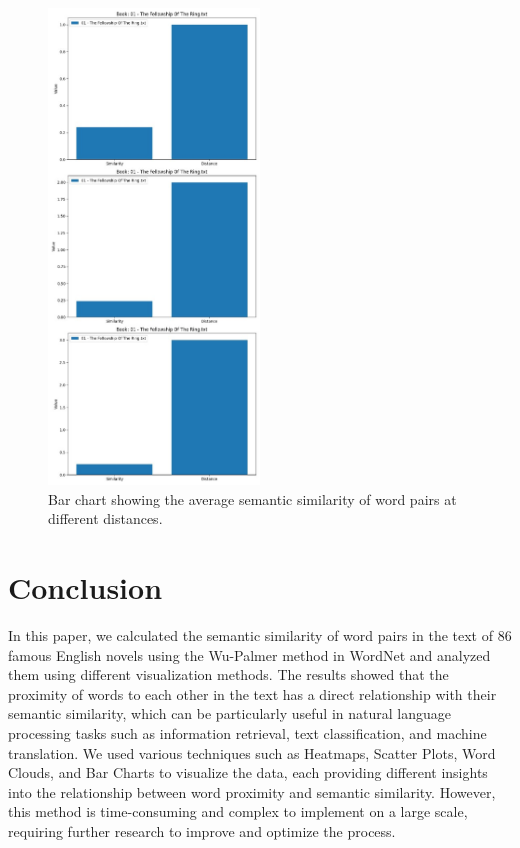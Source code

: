 \documentclass{article}
\begin{document}
\begin{figure}[H]
    \centering
    \includegraphics[width=0.5\textwidth]{img/bar_chart.jpg}
    \caption{Bar chart showing the average semantic similarity of word pairs at different distances.}
    \label{fig:bar_chart_1}
\end{figure}

\section{Conclusion}

In this paper, we calculated the semantic similarity of word pairs in the text of 86 famous English novels using the Wu-Palmer method in WordNet and analyzed them using different visualization methods. The results showed that the proximity of words to each other in the text has a direct relationship with their semantic similarity, which can be particularly useful in natural language processing tasks such as information retrieval, text classification, and machine translation. We used various techniques such as Heatmaps, Scatter Plots, Word Clouds, and Bar Charts to visualize the data, each providing different insights into the relationship between word proximity and semantic similarity. However, this method is time-consuming and complex to implement on a large scale, requiring further research to improve and optimize the process.
\end{document}
